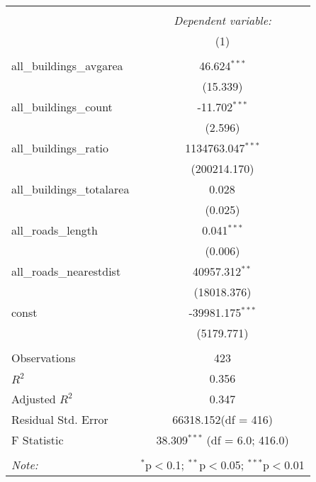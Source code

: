 \begin{table}[!htbp] \centering
\begin{tabular}{@{\extracolsep{5pt}}lc}
\\[-1.8ex]\hline
\hline \\[-1.8ex]
& \multicolumn{1}{c}{\textit{Dependent variable:}} \
\cr \cline{1-2}
\\[-1.8ex] & (1) \\
\hline \\[-1.8ex]
 all_buildings_avgarea & 46.624$^{***}$ \\
  & (15.339) \\
 all_buildings_count & -11.702$^{***}$ \\
  & (2.596) \\
 all_buildings_ratio & 1134763.047$^{***}$ \\
  & (200214.170) \\
 all_buildings_totalarea & 0.028$^{}$ \\
  & (0.025) \\
 all_roads_length & 0.041$^{***}$ \\
  & (0.006) \\
 all_roads_nearestdist & 40957.312$^{**}$ \\
  & (18018.376) \\
 const & -39981.175$^{***}$ \\
  & (5179.771) \\
\hline \\[-1.8ex]
 Observations & 423 \\
 $R^2$ & 0.356 \\
 Adjusted $R^2$ & 0.347 \\
 Residual Std. Error & 66318.152(df = 416)  \\
 F Statistic & 38.309$^{***}$ (df = 6.0; 416.0) \\
\hline
\hline \\[-1.8ex]
\textit{Note:} & \multicolumn{1}{r}{$^{*}$p$<$0.1; $^{**}$p$<$0.05; $^{***}$p$<$0.01} \\
\end{tabular}
\end{table}